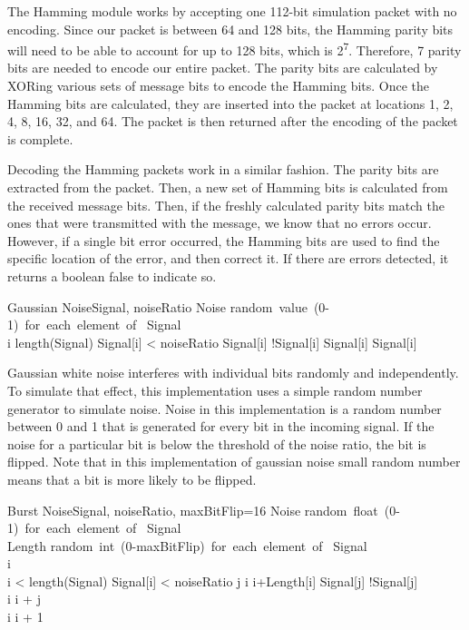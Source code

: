 \documentclass{sigcomm-alternate}
\begin{document}
The Hamming module works by accepting one 112-bit simulation packet with no encoding. Since our packet is between 64 and 128 bits, the Hamming parity bits will need to be able to account for up to 128 bits, which is 2\textsuperscript{7}. Therefore, 7 parity bits are needed to encode our entire packet. The parity bits are calculated by XORing various sets of message bits to encode the Hamming bits. Once the Hamming bits are calculated, they are inserted into the packet at locations 1, 2, 4, 8, 16, 32, and 64. The packet is then returned after the encoding of the packet is complete.

Decoding the Hamming packets work in a similar fashion. The parity bits are extracted from the packet. Then, a new set of Hamming bits is calculated from the received message bits. Then, if the freshly calculated parity bits match the ones that were transmitted with the message, we know that no errors occur. However, if a single bit error occurred, the Hamming bits are used to find the specific location of the error, and then correct it. If there are errors detected, it returns a boolean false to indicate so.

\begin{pseudocode}{Gaussian Noise}{Signal, noiseRatio}
	Noise \GETS \mbox{random value (0-1) for each element of } Signal\\
	\FOR i  \TO length(Signal) \DO
		\BEGIN
			\IF Signal[i] < noiseRatio
			\THEN
				Signal[i] \GETS !Signal[i]
			\ELSE
				Signal[i] \GETS Signal[i]
		\END\\
\end{pseudocode}

Gaussian white noise interferes with individual bits randomly and independently. To simulate that effect, this implementation uses a simple random number generator to simulate noise. Noise in this implementation is a random number between 0 and 1 that is generated for every bit in the incoming signal. If the noise for a particular bit is below the threshold of the noise ratio, the bit is flipped. Note that in this implementation of gaussian noise small random number means that a bit is more likely to be flipped.

\begin{pseudocode}{Burst Noise}{Signal, noiseRatio, maxBitFlip=16}
	Noise \GETS \mbox{random float (0-1) for each element of } Signal\\
	Length \GETS \mbox{random int (0-maxBitFlip) for each element of } Signal\\
	i \\	
	\WHILE i < length(Signal) \DO
		\BEGIN
			\IF Signal[i] < noiseRatio
			\THEN
				\BEGIN
					\FOR j \GETS i \TO i+Length[i] \DO
						\BEGIN
							Signal[j] \GETS !Signal[j]
						\END\\
					i \GETS i + j\\
				\END
			\ELSE
				i \GETS i + 1
		\END\\
\end{pseudocode}
\end{document}
